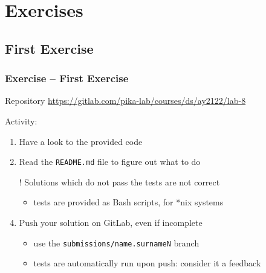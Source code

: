 \documentclass{beamer}\mode<presentation>{\usetheme{AMSBolognaFC}}
\newcommand{\labN}{8}
\newcommand{\labGroup}{https://gitlab.com/pika-lab/courses/ds/ay2122}
\newcommand{\labRepo}{\labGroup/lab-\labN}
\begin{document}
\section{Exercises}

\subsection{First Exercise}

\startExercise

\begin{frame}[allowframebreaks]
	\frametitle{Exercise \currentExercise{} -- First Exercise}

	\begin{block}{Repository}\centering
		\url{\labRepo}
	\end{block}

	\bigskip

	Activity:
	\medskip
	\begin{enumerate}
		\item Have a look to the provided code

		\medskip

		\item Read the \texttt{README.md} file to figure out what to do

		\framebreak

		\item[!] Solutions which do not pass the tests are not correct
		\begin{itemize}
			\item tests are provided as Bash scripts, for *nix systems
		\end{itemize}

		\medskip

		\item Push your solution on GitLab, \alert{even if incomplete}
		\begin{itemize}
			\item use the \texttt{submissions/\alert{name.surnameN}} branch
			\item tests are automatically run upon push: consider it a feedback
		\end{itemize}

	\end{enumerate}

\end{frame}

\section*{}
\frame{\titlepage}
\end{document}
